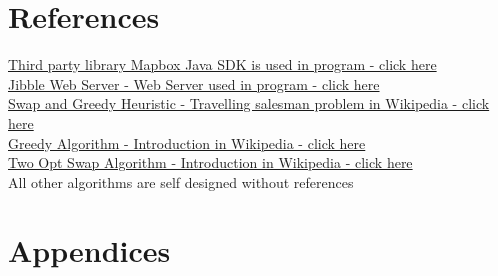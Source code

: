 \documentclass[12pt]{article}
\begin{document}
\section{References}
\href{https://docs.mapbox.com/android/java/overview/}{Third party library Mapbox Java SDK is used in program - click here}\\
\href{http://www.jibble.org/jibblewebserver.php}{Jibble Web Server - Web Server used in program - click here}\\
\href{https://en.wikipedia.org/wiki/Travelling\_salesman\_problem#Heuristic\_and\_approximation\_algorithms}{Swap and Greedy Heuristic - Travelling salesman problem in Wikipedia - click here}\\
\href{https://en.wikipedia.org/wiki/Greedy_algorithm}{Greedy Algorithm - Introduction in Wikipedia - click here}\\
\href{https://en.wikipedia.org/wiki/2-opt}{Two Opt Swap Algorithm - Introduction in Wikipedia - click here}\\
All other algorithms are self designed without references

\section{Appendices}
\end{document}
